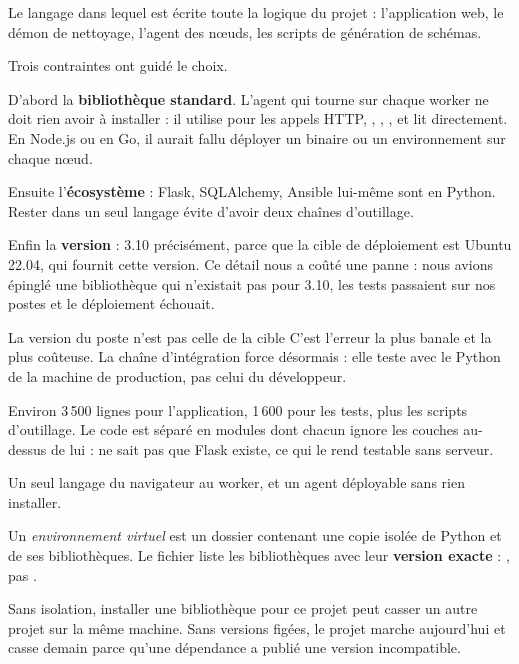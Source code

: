 \quoi
Le langage dans lequel est écrite toute la logique du projet : l'application
web, le démon de nettoyage, l'agent des nœuds, les scripts de génération de
schémas.

\pourquoi
Trois contraintes ont guidé le choix.

D'abord la \textbf{bibliothèque standard}. L'agent qui tourne sur chaque worker
ne doit rien avoir à installer : il utilise  pour les appels HTTP,
, , , et lit 
directement. En Node.js ou en Go, il aurait fallu déployer un binaire ou un
environnement sur chaque nœud.

Ensuite l'\textbf{écosystème} : Flask, SQLAlchemy, Ansible lui-même sont en
Python. Rester dans un seul langage évite d'avoir deux chaînes d'outillage.

Enfin la \textbf{version} : 3.10 précisément, parce que la cible de
déploiement est Ubuntu 22.04, qui fournit cette version. Ce détail nous a
coûté une panne : nous avions épinglé une bibliothèque qui n'existait pas pour
3.10, les tests passaient sur nos postes et le déploiement échouait.

\begin{piege}{La version du poste n'est pas celle de la cible}
C'est l'erreur la plus banale et la plus coûteuse. La chaîne d'intégration
force désormais  : elle teste avec le Python de la
machine de production, pas celui du développeur.
\end{piege}

\role
Environ 3\,500 lignes pour l'application, 1\,600 pour les tests, plus les
scripts d'outillage. Le code est séparé en modules dont chacun ignore les
couches au-dessus de lui :  ne sait pas que Flask
existe, ce qui le rend testable sans serveur.

\apport
Un seul langage du navigateur au worker, et un agent déployable sans rien
installer.


\quoi
Un \emph{environnement virtuel} est un dossier contenant une copie isolée de
Python et de ses bibliothèques. Le fichier  liste les
bibliothèques avec leur \textbf{version exacte} : , pas
.

\pourquoi
Sans isolation, installer une bibliothèque pour ce projet peut casser un autre
projet sur la même machine. Sans versions figées, le projet marche aujourd'hui
et casse demain parce qu'une dépendance a publié une version incompatible.

